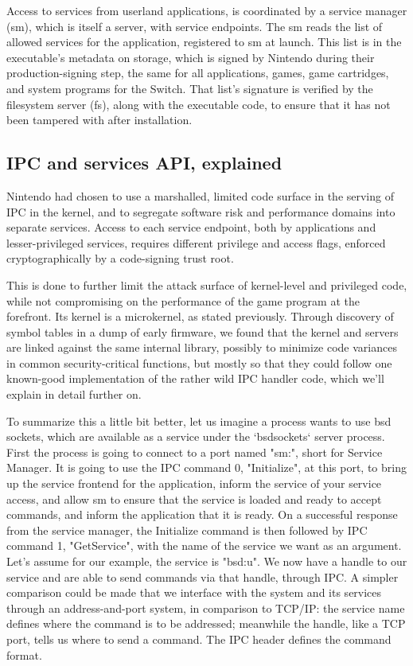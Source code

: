 \documentclass[journal]{IEEEtran}
\begin{document}
Access to services from userland applications, is coordinated by a service manager (sm),
which is itself a server, with service endpoints. The sm reads the list of allowed services for the
application, registered to sm at launch. This list is in the executable's metadata on storage,
which is signed by Nintendo during their production-signing step, the same for all applications,
games, game cartridges, and system programs for the Switch. That list's signature is verified by the
filesystem server (fs), along with the executable code, to ensure that it has not been tampered
with after installation.

\subsection{IPC and services API, explained}

Nintendo had chosen to use a marshalled, limited code surface in the serving of IPC in the kernel,
and to segregate software risk and performance domains into separate services. Access to each
service endpoint, both by applications and lesser-privileged services, requires different privilege
and access flags, enforced cryptographically by a code-signing trust root.

This is done to further limit the attack surface of kernel-level and privileged code, while not
compromising on the performance of the game program at the forefront. Its kernel is a microkernel,
as stated previously. Through discovery of symbol tables in a dump of early firmware, we found
that the kernel and servers are linked against the same internal library, possibly to minimize code
variances in common security-critical functions, but mostly so that they could follow one known-good
implementation of the rather wild IPC handler code, which we'll explain in detail further on.

To summarize this a little bit better, let us imagine a process wants to use bsd sockets, which
are available as a service under the `bsdsockets` server process. First the process is going to
connect to a port named "sm:", short for Service Manager. It is going to use the IPC command 0,
"Initialize", at this port, to bring up the service frontend for the application, inform the service
of your service access, and allow sm to
ensure that the service is loaded and ready to accept commands, and inform the application that it
is ready. On a successful response from the service manager, the Initialize command is then followed
by IPC command 1, "GetService", with the name of the service we want as an argument. Let's assume
for our example, the service is "bsd:u". We now have a handle to our service and are able to send
commands via that handle, through IPC. A simpler comparison could be made that we interface with the
system and its services through an address-and-port system, in comparison to TCP/IP: the service
name defines where the command is to be addressed; meanwhile the handle, like a TCP port, tells us
where to send a command. The IPC header defines the command format.
\end{document}
